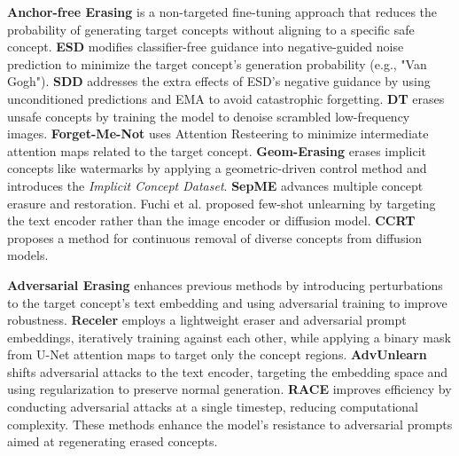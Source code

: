 \textbf{Anchor-free Erasing} is a non-targeted fine-tuning approach that reduces the probability of generating target concepts without aligning to a specific safe concept. 
\textbf{ESD} \cite{gandikota2023erasing} modifies classifier-free guidance into negative-guided noise prediction to minimize the target concept’s generation probability (e.g., "Van Gogh"). \textbf{SDD} \cite{kim2023towards} addresses the extra effects of ESD’s negative guidance by using unconditioned predictions and EMA to avoid catastrophic forgetting. \textbf{DT} \cite{ni2023degeneration} erases unsafe concepts by training the model to denoise scrambled low-frequency images. \textbf{Forget-Me-Not} \cite{zhang2024forget} uses Attention Resteering to minimize intermediate attention maps related to the target concept. \textbf{Geom-Erasing} \cite{liu2024implicit} erases implicit concepts like watermarks by applying a geometric-driven control method and introduces the \emph{Implicit Concept Dataset}. \textbf{SepME} \cite{zhao2024separable} advances multiple concept erasure and restoration. Fuchi et al. \cite{fuchi2024erasing} proposed few-shot unlearning by targeting the text encoder rather than the image encoder or diffusion model.
\textbf{CCRT} \cite{han2024continuous} proposes a method for continuous removal of diverse concepts from diffusion models.


\textbf{Adversarial Erasing} enhances previous methods by introducing perturbations to the target concept's text embedding and using adversarial training to improve robustness. \textbf{Receler} \cite{huang2023receler} employs a lightweight eraser and adversarial prompt embeddings, iteratively training against each other, while applying a binary mask from U-Net attention maps to target only the concept regions. \textbf{AdvUnlearn} \cite{zhang2024defensive} shifts adversarial attacks to the text encoder, targeting the embedding space and using regularization to preserve normal generation. \textbf{RACE} \cite{kim2024race} improves efficiency by conducting adversarial attacks at a single timestep, reducing computational complexity. These methods enhance the model’s resistance to adversarial prompts aimed at regenerating erased concepts.


